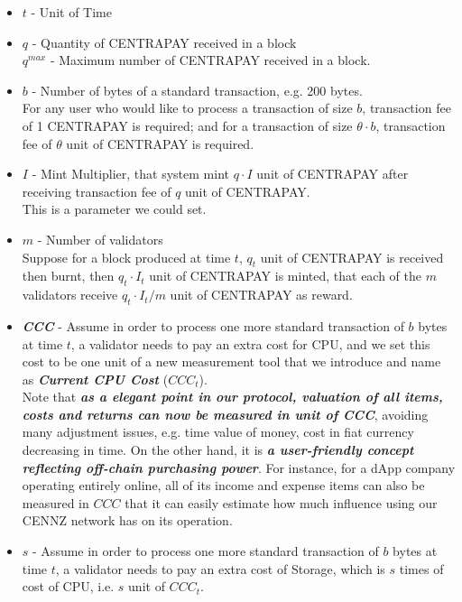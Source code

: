 \documentclass{article}
\begin{document}
\begin{itemize}
  \item $t$ - Unit of Time
  
  \item $q$ - Quantity of CENTRAPAY received in a block\\
  $q^{max}$ - Maximum number of CENTRAPAY received in a block.

  \item $b$ - Number of bytes of a standard transaction, e.g. 200 bytes.\\For any user who would like to process a transaction of size $b$, transaction fee of 1 CENTRAPAY is required; and for a transaction of size $\theta\cdot b$, transaction fee of $\theta$ unit of CENTRAPAY is required.
  
  \item $I$ - Mint Multiplier, that system mint $q\cdot I$ unit of CENTRAPAY after receiving transaction fee of $q$ unit of CENTRAPAY. \\
  This is a parameter we could set.
  
  \item $m$ - Number of validators\\
  Suppose for a block produced at time $t$,  $q_t$ unit of CENTRAPAY is received then burnt, then $q_t\cdot I_t$ unit of CENTRAPAY is minted, that each of the $m$ validators receive $q_t\cdot I_t/m$ unit of CENTRAPAY as reward. 
  
  \item  \textbf{\textit{CCC}} - Assume in order to process one more standard transaction of $b$ bytes at time $t$, a validator needs to pay an extra cost for CPU, and we set this cost to be one unit of a new measurement tool that we introduce and name as \textbf{\textit{Current CPU Cost}} (\textbf{$CCC_t$}). \\
  
  Note that \textbf{\textit{as a elegant point in our protocol, valuation of all items, costs and returns can now be measured in unit of CCC}}, avoiding many adjustment issues, e.g. time value of money, cost in fiat currency decreasing in time. On the other hand, it is \textbf{\textit{a user-friendly concept reflecting off-chain purchasing power}}. For instance, for a dApp company operating entirely online, all of its income and expense items can also be measured in $CCC$ that it can easily estimate how much influence using our CENNZ network has on its operation. 
  
  \item $s$ - Assume in order to process one more standard transaction of $b$ bytes at time $t$, a validator needs to pay an extra cost of Storage, which is $s$ times of cost of CPU, i.e. $s$ unit of $CCC_t$.
    

\end{itemize}
\end{document}
